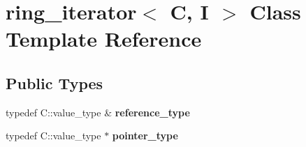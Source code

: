 \hypertarget{classring__iterator}{}\section{ring\+\_\+iterator$<$ C, I $>$ Class Template Reference}
\label{classring__iterator}
\subsection*{Public Types}
\begin{DoxyCompactItemize}
\item 
\mbox{\label{classring__iterator_ab0e89893934c0c7efe0575b39a02fff3}} 
typedef C\+::value\+\_\+type \& {\bfseries reference\+\_\+type}
\item 
\mbox{\label{classring__iterator_afa40859958028339a8800b9bcdc3b4d6}} 
typedef C\+::value\+\_\+type $\ast$ {\bfseries pointer\+\_\+type}
\end{DoxyCompactItemize}
